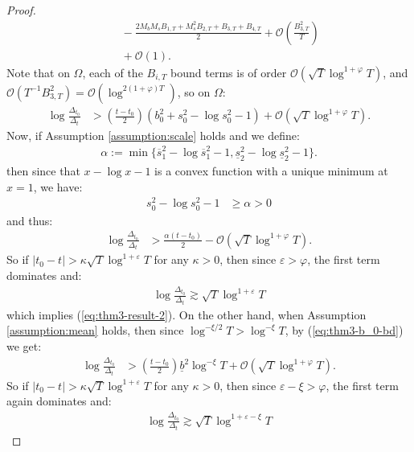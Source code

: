 \begin{proof}
\begin{align*}
    &\quad\: -\frac{2M_bM_sB_{1,T} + M_s^2 B_{2,T} +B_{3,T} + B_{4,T}}{2} + \mathcal{O}\left(\frac{B^2_{3,T}}{T}\right) \\
    &\quad\: + \mathcal{O}(1). 
\end{align*}
Note that on $\Omega$, each of the $B_{i,T}$ bound terms is of order $\mathcal{O}(\sqrt{T}\log^{1+\varphi}T)$, and $\mathcal{O}\left(T^{-1}B^2_{3,T}\right) = \mathcal{O}\left(\log^{2(1+\varphi)T}\right)$, so on $\Omega$:
\begin{align*}
    \log \frac{\Delta_{t_0}}{\Delta_t} &> \left(\frac{t-t_0}{2}\right)\left(b_0^2 + s_0^2 - \log s_0^2 - 1\right) + \mathcal{O}(\sqrt{T}\log^{1+\varphi}T). 
\end{align*}
Now, if Assumption \ref{assumption:scale} holds and we define:
\begin{align*}
    \alpha := \min\{\overline{s}_1^2 - \log \overline{s}_1^2 - 1, \underline{s}_2^2 - \log \underline{s}_2^2 - 1\}.
\end{align*}
then since that $x - \log x - 1$ is a convex function with a unique minimum at $x = 1$, we have:
\begin{align*}
    s_0^2 - \log s_0^2 - 1 &\geq \alpha > 0
\end{align*}
and thus:
\begin{align*}
    \log \frac{\Delta_{t_0}}{\Delta_t} &> \frac{\alpha(t-t_0)}{2} - \mathcal{O}(\sqrt{T}\log^{1+\varphi}T).
\end{align*}
So if $|t_0 -t| > \kappa \sqrt{T}\log^{1+\varepsilon}T$ for any $\kappa > 0$, then since $\varepsilon > \varphi$, the first term dominates and:
\begin{align*}
    \log \frac{\Delta_{t_0}}{\Delta_t} \gtrsim \sqrt{T}\log^{1+\varepsilon}T
\end{align*}
which implies (\ref{eq:thm3-result-2}). On the other hand, when Assumption \ref{assumption:mean} holds, then since $\log^{-\xi/2} T > \log^{-\xi} T$, by (\ref{eq:thm3-b_0-bd}) we get:
\begin{align*}
    \log \frac{\Delta_{t_0}}{\Delta_t} &> \left(\frac{t-t_0}{2}\right)\underline{b}^2\log^{-\xi} T + \mathcal{O}(\sqrt{T}\log^{1+\varphi}T). 
\end{align*}
So if $|t_0 -t| > \kappa \sqrt{T}\log^{1+\varepsilon}T$ for any $\kappa > 0$, then since $\varepsilon - \xi > \varphi$, the first term again dominates and:
\begin{align*}
    \log \frac{\Delta_{t_0}}{\Delta_t} \gtrsim \sqrt{T}\log^{1+\varepsilon -\xi}T
\end{align*}

\end{proof}
